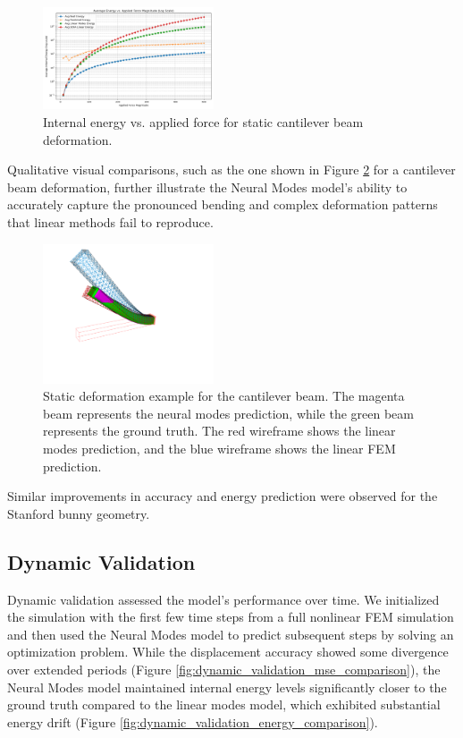 \documentclass[11pt,a4paper,twocolumn]{article}
\begin{document}
\begin{figure}[H]
    \centering
    \includegraphics[width=0.45\textwidth]{Images/beam_static_energy.png}
    \caption{Internal energy vs. applied force for static cantilever beam deformation.}
    \label{fig:static_energy_beam}
\end{figure}

Qualitative visual comparisons, such as the one shown in Figure \ref{fig:static_rmse_distribution} for a cantilever beam deformation, further illustrate the Neural Modes model's ability to accurately capture the pronounced bending and complex deformation patterns that linear methods fail to reproduce.

\begin{figure}[H]
    \centering
    \includegraphics[width=0.45\textwidth]{Images/sofa_example_beam.png}
    \caption{Static deformation example for the cantilever beam. The magenta beam represents the neural modes prediction, while the green beam represents the ground truth. The red wireframe shows the linear modes prediction, and the blue wireframe shows the linear FEM prediction.}
    \label{fig:static_rmse_distribution}
\end{figure}

Similar improvements in accuracy and energy prediction were observed for the Stanford bunny geometry.

\subsection{Dynamic Validation}
Dynamic validation assessed the model's performance over time. We initialized the simulation with the first few time steps from a full nonlinear FEM simulation and then used the Neural Modes model to predict subsequent steps by solving an optimization problem. While the displacement accuracy showed some divergence over extended periods (Figure \ref{fig:dynamic_validation_mse_comparison}), the Neural Modes model maintained internal energy levels significantly closer to the ground truth compared to the linear modes model, which exhibited substantial energy drift (Figure \ref{fig:dynamic_validation_energy_comparison}).
\end{document}
